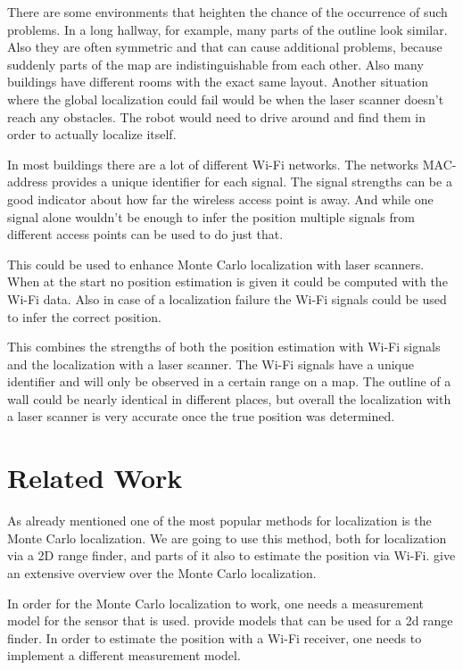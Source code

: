 There are some environments that heighten the chance of the occurrence of such problems. In a long hallway, for example, many parts of the outline look similar. Also they are often symmetric and that can cause additional problems, because suddenly parts of the map are indistinguishable from each other. Also many buildings have different rooms with the exact same layout. Another situation where the global localization could fail would be when the laser scanner doesn't reach any obstacles. The robot would need to drive around and find them in order to actually localize itself. 
 
In most buildings there are a lot of different Wi-Fi networks. The networks MAC-address provides a unique identifier for each signal. The signal strengths can be a good indicator about how far the wireless access point is away. And while one signal alone wouldn't be enough to infer the position multiple signals from different access points can be used to do just that.

This could be used to enhance Monte Carlo localization with laser scanners. When at the start no position estimation is given it could be computed with the Wi-Fi data. Also in case of a localization failure the Wi-Fi signals could be used to infer the correct position.

This combines the strengths of both the position estimation with Wi-Fi signals and the localization with a laser scanner. The Wi-Fi signals have a unique identifier and will only be observed in a certain range on a map. The outline of a wall could be nearly identical in different places, but overall the localization with a laser scanner is very accurate once the true position was determined. 

\section{Related Work}
As already mentioned one of the most popular methods for localization is the Monte Carlo localization. We are going to use this method, both for localization via a 2D range finder, and parts of it also to estimate the position via Wi-Fi. \cite{Thrun:2005:PR:1121596} give an extensive overview over the Monte Carlo localization.

In order for the Monte Carlo localization to work, one needs a measurement model for the sensor that is used. \cite{Thrun:2005:PR:1121596} provide models that can be used for a 2d range finder. In order to estimate the position with a Wi-Fi receiver, one needs to implement a different measurement model.

